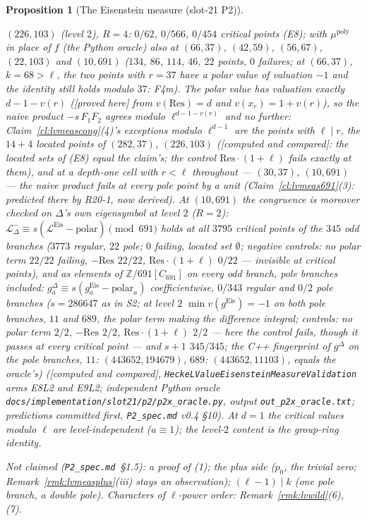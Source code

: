 \documentclass[11pt]{article}
\newtheorem{proposition}[theorem]{Proposition}
\theoremstyle{remark}
\newcommand{\Z}{\mathbb{Z}}
\newcommand{\PROVED}{\textsf{[proved here]}}
\newcommand{\CMPD}{\textsf{[computed and compared]}}   %
\begin{document}
\begin{proposition}[The Eisenstein measure (slot-21 P2)]
\begin{enumerate}
  $(226,103)$ (level $2$), $R=4$: $0/62$, $0/566$, $0/454$ critical points (E8); with $\mu^{\mathrm{poly}}$ in place of $f$ (the Python oracle) also at $(66,37)$, $(42,59)$, $(56,67)$, $(22,103)$ and
  $(10,691)$ ($134$, $86$, $114$, $46$, $22$ points, $0$ failures; at $(66,37)$, $k=68>\ell$, the two points with $r=37$ have a polar value of valuation $-1$ and the
  identity still holds modulo $37$: F4m). The polar value has valuation exactly $d-1-v(r)$ (\PROVED{} from $v(\mathrm{Res})=d$ and $v(x_r)=1+v(r)$), so the naive product
  $-s\,F_1F_2$ agrees modulo $\ell^{d-1-v(r)}$ and no further: Claim~\ref{cl:lvmeascong}(4)'s exceptions modulo $\ell^{d-1}$ are the points with $\ell\mid r$, the $14+4$ located points of
  $(282,37)$, $(226,103)$ (\CMPD: the located sets of (E8) equal the claim's; the control $\mathrm{Res}\cdot(1+\ell)$ fails exactly at them), and at a depth-one cell with $r<\ell$ throughout ---
  $(30,37)$, $(10,691)$ --- the naive product fails at every pole point by a unit (Claim~\ref{cl:lvmeas691}(3): predicted there by R20-1, now derived). At $(10,691)$ the congruence is moreover \emph{checked on $\Delta$'s own eigensymbol at level $2$} ($R=2$): $\mathcal L^{-}_{\Delta}\equiv s(\mathcal L^{\mathrm{Eis}}-\mathrm{polar})\pmod{691}$
  holds at all $3795$ critical points of the $345$ odd branches ($3773$ regular, $22$ pole; $0$ failing, located set $\emptyset$; negative controls: no polar term $22/22$ failing, $-\mathrm{Res}$ $22/22$,
  $\mathrm{Res}\cdot(1+\ell)$ $0/22$ --- invisible at critical points), and as elements of $\Z/691[C_{691}]$ on every odd branch, pole branches included: $g^{\Delta}_a\equiv s(g^{\mathrm{Eis}}_a-\mathrm{polar}_a)$ coefficientwise,
  $0/343$ regular and $0/2$ pole branches ($s=286647$ as in S2; at level $2$ $\min v(g^{\mathrm{Eis}})=-1$ on both pole branches, $11$ and $689$, the polar term making the difference integral; controls: no polar term $2/2$, $-\mathrm{Res}$ $2/2$,
  $\mathrm{Res}\cdot(1+\ell)$ $2/2$ --- here the control fails, though it passes at every critical point --- and $s+1$ $345/345$; the C++ fingerprint of $g^{\Delta}$ on the pole branches, $11$: $(443652,194679)$, $689$: $(443652,11103)$, equals the oracle's)
  (\CMPD, \texttt{HeckeLValueEisensteinMeasureValidation} arms E8L2 and E9L2; independent Python oracle \texttt{docs/implementation/slot21/p2/p2x\_oracle.py}, output \texttt{out\_p2x\_oracle.txt}; predictions committed first, \texttt{P2\_spec.md} v0.4 \S10).
  At $d=1$ the critical values modulo $\ell$ are level-independent ($u\equiv1$); the level-$2$ content is the group-ring identity.
\end{enumerate}
\emph{Not claimed} (\texttt{P2\_spec.md}~\S1.5): a proof of (1); the plus side ($p_0$, the trivial zero; Remark~\ref{rmk:lvmeasplus}(iii) stays an observation); $(\ell-1)\mid k$ (one pole branch, a double
pole). Characters of $\ell$-power order: Remark~\ref{rmk:lvwild}(6), (7).
\end{proposition}
\end{document}
